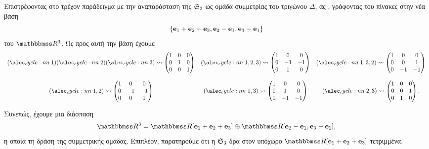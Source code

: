 \documentclass[12pt,a4paper,reqno]{amsart}
\begin{document}
Επιστρέφοντας στο τρέχον παράδειγμα με την αναπαράσταση της $\mathfrak{S}_3$ ως ομάδα συμμετρίας του τριγώνου $\Delta$, ας , γράφοντας του πίνακες στην νέα βάση 
\[
\{\mathbf{e}_1 + \mathbf{e}_2 + \mathbf{e}_3, \mathbf{e}_2-\mathbf{e}_1, \mathbf{e}_3-\mathbf{e}_1\}
\]
του $\RR^3$. Ως προς αυτή την βάση έχουμε 
\[
\begin{array}{ccc}
    \cycle{1}\cycle{2}\cycle{3} \rightsquigarrow 
    \begin{pmatrix} 
        1 & 0 & 0 \\ 
        0 & 1 & 0 \\ 
        0 & 0 & 1 
    \end{pmatrix}  
    & \cycle{1,2,3} \rightsquigarrow 
    \begin{pmatrix} 
        1 & 0 & 0 \\ 
        0 & -1 & -1 \\ 
        0 & 1 & 0 
    \end{pmatrix}
    & \cycle{1,3,2} \rightsquigarrow 
    \begin{pmatrix} 
        1 & 0 & 0 \\ 
        0 & 0 & 1 \\ 
        0 & -1 & -1 
    \end{pmatrix} \\
     &  &  \\
    \cycle{1,2} \rightsquigarrow 
    \begin{pmatrix} 
        1 & 0 & 0 \\ 
        0 & -1 & -1 \\ 
        0 & 0 & 1 
    \end{pmatrix} 
    & \cycle{1,3} \rightsquigarrow 
    \begin{pmatrix} 
        1 & 0 & 0 \\ 
        0 & 1 & 0 \\ 
        0 & -1 & -1 
    \end{pmatrix} 
    & \cycle{2,3} \rightsquigarrow 
    \begin{pmatrix} 
        1 & 0 & 0 \\ 
        0 & 0 & 1 \\ 
        0 & 1 & 0 
    \end{pmatrix}.
\end{array}
\]

Συνεπώς, έχουμε μια διάσπαση
%
\begin{equation}
\label{eq:decomposition_R3}
\RR^3 = \RR[\bfe_1+\bfe_2+\bfe_3] \oplus \RR[\bfe_2-\bfe_1, \bfe_3-\bfe_1],
\end{equation}
%
η οποία  τη δράση της συμμετρικής ομάδας. 
Επιπλέον, παρατηρούμε ότι η $\mathfrak{S}_3$ δρα στον υπόχωρο $\RR[\bfe_1+\bfe_2+\bfe_3]$ τετριμμένα.
\end{document}
